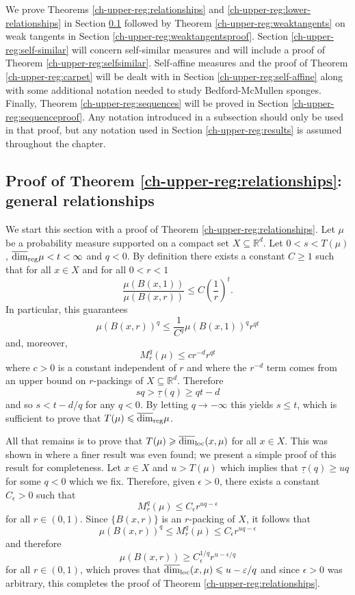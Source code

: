 We prove Theorems \ref{ch-upper-reg:relationships} and \ref{ch-upper-reg:lower-relationships} in Section \ref{ch-upper-reg:spectrumproof} followed by Theorem \ref{ch-upper-reg:weaktangents} on weak tangents in Section \ref{ch-upper-reg:weaktangentsproof}. Section \ref{ch-upper-reg:self-similar} will concern self-similar measures and will include a proof of Theorem \ref{ch-upper-reg:selfsimilar}. Self-affine measures and the proof of Theorem \ref{ch-upper-reg:carpet} will be dealt with in Section \ref{ch-upper-reg:self-affine} along with some additional notation needed to study Bedford-McMullen sponges. Finally, Theorem \ref{ch-upper-reg:sequences} will be proved in Section \ref{ch-upper-reg:sequenceproof}. Any notation introduced in a subsection should only be used in that proof, but any notation used in Section \ref{ch-upper-reg:results} is assumed throughout the chapter.







\subsection{Proof of Theorem \ref{ch-upper-reg:relationships}: general relationships}\label{ch-upper-reg:spectrumproof}

We start this section with a proof of Theorem \ref{ch-upper-reg:relationships}. Let $\mu$ be a probability measure supported on a compact set $X \subseteq \mathbb{R}^d$. Let $0<s< T(\mu)$,  $\overline{\dim}_{\textup{reg}} \mu < t < \infty$ and $q<0$. By definition there exists a  constant  $C \geq 1$ such that for all $x\in X$ and for all $0<r< 1$
\[
\frac{\mu(B(x,1))}{\mu(B(x,r))} \le C \left(\frac{1}{r} \right)^t.
\]
In particular, this guarantees 
\[
\mu(B(x,r))^q \le \frac{1}{C^q}\mu(B(x,1))^q  r^{qt}
\]
and, moreover, 
\[
M_r^q(\mu) \leq c r^{-d}r^{qt}
\]
where $c>0$ is a constant independent of  $r$ and where the $r^{-d}$ term comes from an upper bound on $r$-packings of $X \subseteq \mathbb{R}^d$.  Therefore 
\[
sq > \underline{\tau}(q)   \ge  qt-d
\]
and so $s<t-d/q$ for any $q<0$. By letting $q \rightarrow - \infty$ this yields $s \le t$, which is sufficient to prove that $T(\mu) \leqslant \overline{\dim}_{\textup{reg}} \mu$.

All that remains is to prove that $T(\mu) \geqslant \overline{\dim}_{\textup{loc}}(x,\mu)$ for all $x \in X$. This was shown in \cite{olsenformalism} where a finer result was even found; we present a simple proof of this result for completeness. Let $x \in X$ and $u>T(\mu)$ which implies that $\underline{\tau}(q)  \geq  uq$ for some $q<0$ which we fix.  Therefore, given $\epsilon>0$, there exists a constant $C_\epsilon>0$ such that
\[
M_r^q(\mu) \leq C_\epsilon r^{uq-\epsilon}
\]
for all $r \in (0,1)$.  Since $\{ B(x,r)\}$ is an $r$-packing of $X$, it follows that
\[
\mu(B(x,r))^q \le M_r^q(\mu) \leq C_\epsilon r^{uq-\epsilon}
\]
and therefore
\[
\mu(B(x,r)) \ge  C_\epsilon^{1/q} r^{u-\epsilon/q}
\]
for all $r\in (0,1)$, which proves that $\overline{\dim}_{\textup{loc}}(x,\mu) \leqslant u-\varepsilon/q$ and since $\epsilon>0$ was arbitrary, this completes the proof of Theorem \ref{ch-upper-reg:relationships}.


